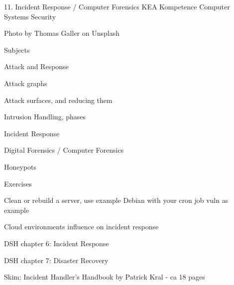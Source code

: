 \documentclass[Screen16to9,17pt]{foils}
\begin{document}
\mytitlepage
{11. Incident Response / Computer Forensics}
{KEA Kompetence Computer Systems Security \the\year}





\begin{list2}
\item 
\end{list2}

  Photo by Thomas Galler on Unsplash


\begin{list1}
\item Subjects
\begin{list2}
\item Attack and Response
\item Attack graphs
\item Attack surfaces, and reducing them
\item Intrusion Handling, phases
\item Incident Response
\item Digital Forensics / Computer Forensics
\item Honeypots
\end{list2}
\item Exercises
\begin{list2}
\item Clean or rebuild a server, use example Debian with your cron job vuln as example

\item Cloud environments influence on incident response
\end{list2}
\end{list1}




\begin{list1}
\item DSH chapter 6: Incident Response
\item DSH chapter 7: Disaster Recovery
\item Skim: Incident Handler's Handbook by Patrick Kral  - ca 18 pages
\end{list1}


\end{document}
